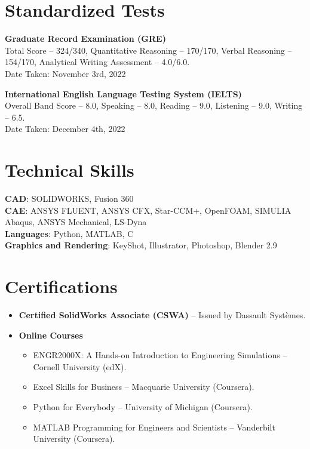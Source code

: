 \documentclass[letterpaper,11pt]{article}
\begin{document}
\section{Standardized Tests}
\begin{itemize}[leftmargin=0in, label={}]
{\item{
\textbf{Graduate Record Examination (GRE)} \\Total Score – 324/340, Quantitative Reasoning – 170/170, Verbal Reasoning – 154/170, Analytical Writing Assessment – 4.0/6.0.\\
Date Taken: November 3rd, 2022
}}
{\item{
{\textbf{International English Language Testing System (IELTS)}\\
Overall Band Score – 8.0, Speaking – 8.0, Reading – 9.0, Listening – 9.0, Writing – 6.5.\\
Date Taken: December 4th, 2022}}}
\end{itemize}

\section{Technical Skills}
\begin{itemize}[leftmargin=0in, label={}]
{\item{
\textbf{CAD}{: SOLIDWORKS, Fusion 360} \\
\textbf{CAE}{: ANSYS FLUENT, ANSYS CFX, Star-CCM+, OpenFOAM, SIMULIA Abaqus, ANSYS Mechanical, LS-Dyna} \\
\textbf{Languages}{: Python, MATLAB, C} \\
\textbf{Graphics and Rendering}{: KeyShot, Illustrator, Photoshop, Blender 2.9} \\
}}
\end{itemize}
\vspace{-16pt}

\section{Certifications}
\begin{itemize}[leftmargin=0.15in]
\item {\textbf{Certified SolidWorks Associate (CSWA)}} – Issued by Dassault Systèmes.
\item \textbf{Online Courses}
\begin{itemize}
\item ENGR2000X: A Hands-on Introduction to Engineering Simulations – Cornell University (edX).
\item Excel Skills for Business – Macquarie University (Coursera).
\item Python for Everybody – University of Michigan (Coursera).
\item MATLAB Programming for Engineers and Scientists – Vanderbilt University (Coursera).
\end{itemize}
\end{itemize}
\end{document}
